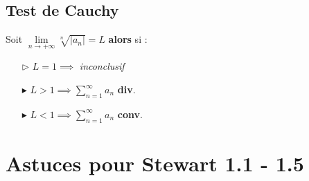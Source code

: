 \documentclass{report}
\begin{document}
\begin{multicols*}{3}
    \section{Test de Cauchy}
    \mbox{}\vspace{0.2em}
    Soit $\lim\limits_{n \to+\infty } \sqrt[n]{\big| a_n \big|} = L$ 
    \textbf{alors} si :   
    \begin{itemize}
    \item [$\rhd$ ] $L = 1 \implies$ \textit{inconclusif}  
    \item [$\blacktriangleright$ ] $L > 1 \implies \sum_{n=1}^{\infty }a_n$ 
        \textcolor{myr}{\textbf{div}}. 
    \item [$\blacktriangleright$ ] $L < 1 \implies \sum_{n=1}^{\infty }a_n$ 
        \textcolor{myb}{\textbf{conv}}. 
    \end{itemize}


                                                



     





    

       








        





  





 
    \chapter{Astuces pour Stewart 1.1 - 1.5}

\end{multicols*}
\end{document}
